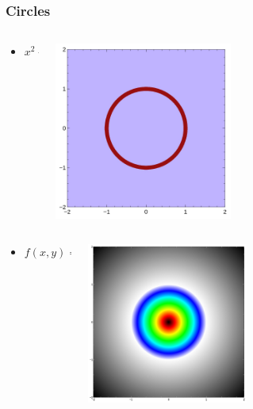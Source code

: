 \documentclass{beamer}
\begin{document}
\begin{frame}
\frametitle{Circles}
\begin{columns}
  \begin{column}{0.5\textwidth}
    \begin{itemize}
    \item $x^2+y^2=r^2$
    \end{itemize}
  \end{column}
  \begin{column}{0.5\textwidth}
    \includegraphics[width=0.5\textwidth, right]{normal_circle.jpg}
  \end{column}
\end{columns}
\begin{columns}
  \begin{column}{0.5\textwidth}
    \begin{itemize}
    \item $f(x,y)=sqrt(x^2+y^2)-1$
    \end{itemize}
  \end{column}
  \begin{column}{0.5\textwidth}
    \includegraphics[width=0.5\textwidth, right]{implicit_circle.jpg}
  \end{column}
\end{columns}
\end{frame}
\end{document}
